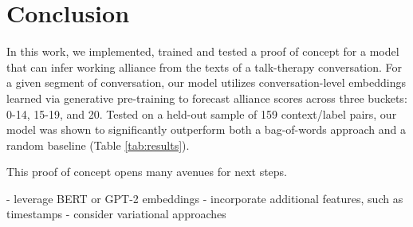 \documentclass{article}
\begin{document}

\section{Conclusion}

In this work, we implemented, trained and tested a proof of concept for a model that can infer working alliance from the texts of a talk-therapy conversation. For a given segment of conversation, our model utilizes conversation-level embeddings learned via generative pre-training to forecast alliance scores across three buckets: 0-14, 15-19, and 20. Tested on a held-out sample of 159 context/label pairs, our model was shown to significantly outperform both a bag-of-words approach and a random baseline (Table \ref{tab:results}).

This proof of concept opens many avenues for next steps. 

- leverage BERT or GPT-2 embeddings
- incorporate additional features, such as timestamps
- consider variational approaches








\end{document}
